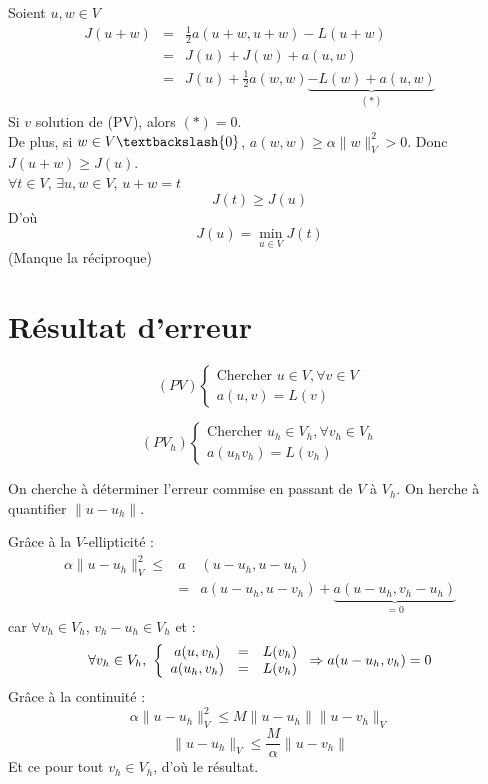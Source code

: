 
\begin{dem}
Soient $u,w\in V$
\begin{eqnarray*}
	J(u+w)&=&\frac{1}{2}a(u+w,u+w)-L(u+w)\\
		&=&J(u)+J(w)+a(u,w)\\
		&=&J(u)+\frac{1}{2}a(w,w)\underbrace{-L(w)+a(u,w)}_{(*)}
\end{eqnarray*}
Si $v$ solution de (PV), alors $(*)=0$.\\
De plus, si $w\in V\textbackslash\{0\}$, $a(w,w)\geq \alpha\|w\|^2_V >0$. Donc $J(u+w)\geq J(u)$.\\
$\forall t\in V$, $\exists u,w\in V$, $u+w=t$\\
	\[J(t)\geq J(u)\]
D'où \[J(u)=\min_{u\in V} J(t)\]
(Manque la réciproque)
\end{dem}

\section{Résultat d'erreur}
\begin{minipage}{0.4\linewidth}
\[(PV)\left\{\begin{array}{c}
\text{Chercher } u\in V, \forall v\in V\\
a(u,v)=L(v)
\end{array}\right.\]
\end{minipage}\hspace{0.1\linewidth}
\begin{minipage}{0.4\linewidth}
\[(PV_h)\left\{\begin{array}{c}
\text{Chercher } u_h\in V_h, \forall v_h\in V_h\\
	a(u_hv_h)=L(v_h)
\end{array}\right.\]
\end{minipage}

On cherche à déterminer l'erreur commise en passant de $V$ à $V_h$. On herche à quantifier $\|u-u_h\|$.\\

\begin{dem}
Grâce à la $V$-ellipticité :
\begin{eqnarray*}
\alpha\|u-u_h\|_V^2\leq &a&(u-u_h,u-u_h)\\
			&=&a(u-u_h, u-v_h)+\underbrace{a(u-u_h, v_h-u_h)}_{=0}
\end{eqnarray*}
car $\forall v_h\in V_h$, $v_h-u_h\in V_h$ et :
	\[\forall v_h\in V_h,\ \left\{\begin{array}{c c c}
		a(u,v_h)&=&L(v_h)\\
		a(u_h,v_h)&=&L(v_h)
	\end{array}\right. \Rightarrow a(u-u_h,v_h)=0\]
Grâce à la continuité :
	\[\alpha\|u-u_h\|_V^2\leq M\|u-u_h\|\|u-v_h\|_V\]
	\[\|u-u_h\|_V\leq \frac{M}{\alpha} \|u-v_h\|\]
Et ce pour tout $v_h\in V_h$, d'où le résultat.
\end{dem}

